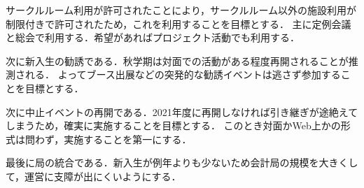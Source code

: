     サークルルーム利用が許可されたことにより，サークルルーム以外の施設利用が制限付きで許可されたため，これを利用することを目標とする．
    主に定例会議と総会で利用する．希望があればプロジェクト活動でも利用する．
    
    次に新入生の勧誘である．秋学期は対面での活動がある程度再開されることが推測される．
    よってブース出展などの突発的な勧誘イベントは逃さず参加することを目標とする．
    
    次に中止イベントの再開である．2021年度に再開しなければ引き継ぎが途絶えてしまうため，確実に実施することを目標とする．
    このとき対面かWeb上かの形式は問わず，実施することを第一にする．
    
    最後に局の統合である．新入生が例年よりも少ないため会計局の規模を大きくして，運営に支障が出にくいようにする．
    